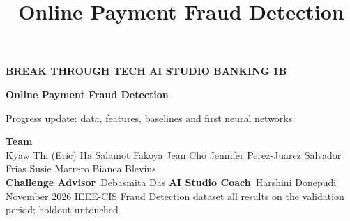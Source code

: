 \documentclass[aspectratio=169,10pt]{beamer}
\title{Online Payment Fraud Detection}
\begin{document}
{
\begin{frame}[plain]
\vspace*{0.5cm}
{\color{mint}\small\bfseries BREAK THROUGH TECH AI STUDIO \textperiodcentered{} BANKING 1B}\\[0.35cm]
{\color{paper}\fontsize{30}{34}\selectfont\bfseries Online Payment Fraud Detection\par}
\vspace{0.2cm}
{\color{mint}\Large Progress update: data, features, baselines and first neural networks\par}
\vspace{0.6cm}
{\color{paper}\small\bfseries Team}\\[2pt]
{\color{mint}\small Kyaw Thi (Eric) Ha \textperiodcentered{} Salamot Fakoya \textperiodcentered{} Jean Cho \textperiodcentered{} Jennifer Perez-Juarez \textperiodcentered{} Salvador Frias \textperiodcentered{} Susie Marrero \textperiodcentered{} Bianca Blevins}\\[0.35cm]
{\color{paper}\small\bfseries Challenge Advisor}\ {\color{mint}\small Debasmita Das}\qquad
{\color{paper}\small\bfseries AI Studio Coach}\ {\color{mint}\small Harshini Donepudi}\\[0.6cm]
{\color{mint}\scriptsize November 2026 \textperiodcentered{} IEEE-CIS Fraud Detection dataset \textperiodcentered{} all results on the validation period; holdout untouched}
\end{frame}}
\end{document}
